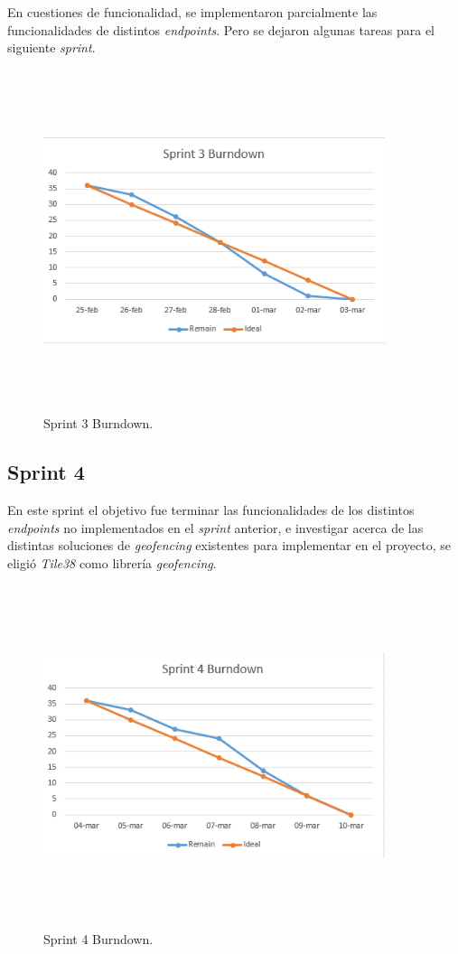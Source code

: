 En cuestiones de funcionalidad, se implementaron parcialmente las funcionalidades de distintos \textit{endpoints}. Pero se dejaron algunas tareas para el siguiente \textit{sprint}.
\begin{figure}[H]
    \centering
    \includegraphics[width=10cm,height=10cm,keepaspectratio]{img/Sprint3_burndow.png}
    \caption{Sprint 3 Burndown.}
    \label{fig:sprint3_burndown}
\end{figure}
\subsection{Sprint 4}

En este sprint el objetivo fue terminar las funcionalidades de los distintos \textit{endpoints} no implementados en el \textit{sprint} anterior, e investigar acerca de las distintas soluciones de \textit{geofencing} existentes para implementar en el proyecto, se eligió \textit{Tile38} como librería \textit{geofencing}.
\begin{figure}[H]
    \centering
    \includegraphics[width=10cm,height=10cm,keepaspectratio]{img/Sprint4_burndow.png}
    \caption{Sprint 4 Burndown.}
    \label{fig:sprint4_burndown}
\end{figure}
